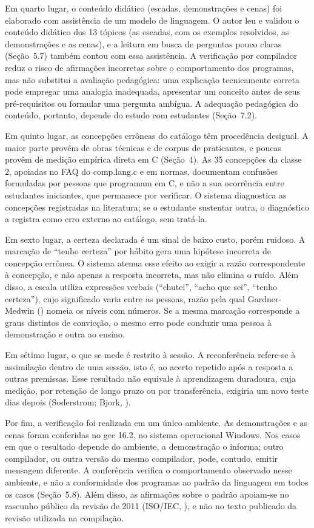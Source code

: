 Em quarto lugar, o conteúdo didático (escadas, demonstrações e cenas) foi elaborado com assistência de um modelo de linguagem. O autor leu e validou o conteúdo didático dos 13 tópicos (as escadas, com os exemplos resolvidos, as demonstrações e as cenas), e a leitura em busca de perguntas pouco claras (Seção~5.7) também contou com essa assistência. A verificação por compilador reduz o risco de afirmações incorretas sobre o comportamento dos programas, mas não substitui a avaliação pedagógica: uma explicação tecnicamente correta pode empregar uma analogia inadequada, apresentar um conceito antes de seus pré-requisitos ou formular uma pergunta ambígua. A adequação pedagógica do conteúdo, portanto, depende do estudo com estudantes (Seção~7.2).

Em quinto lugar, as concepções errôneas do catálogo têm procedência desigual. A maior parte provém de obras técnicas e de corpus de praticantes, e poucas provêm de medição empírica direta em C (Seção~4). As 35 concepções da classe 2, apoiadas no FAQ do comp.lang.c e em normas, documentam confusões formuladas por pessoas que programam em C, e não a sua ocorrência entre estudantes iniciantes, que permanece por verificar. O sistema diagnostica as concepções registradas na literatura; se o estudante sustentar outra, o diagnóstico a registra como erro externo ao catálogo, sem tratá-la.

Em sexto lugar, a certeza declarada é um sinal de baixo custo, porém ruidoso. A marcação de ``tenho certeza'' por hábito gera uma hipótese incorreta de concepção errônea. O sistema atenua esse efeito ao exigir a razão correspondente à concepção, e não apenas a resposta incorreta, mas não elimina o ruído. Além disso, a escala utiliza expressões verbais (``chutei'', ``acho que sei'', ``tenho certeza''), cujo significado varia entre as pessoas, razão pela qual Gardner-Medwin (\citeyear{gardnermedwin2006}) nomeia os níveis com números. Se a mesma marcação corresponde a graus distintos de convicção, o mesmo erro pode conduzir uma pessoa à demonstração e outra ao ensino.

Em sétimo lugar, o que se mede é restrito à sessão. A reconferência refere-se à assimilação dentro de uma sessão, isto é, ao acerto repetido após a resposta a outras premissas. Esse resultado não equivale à aprendizagem duradoura, cuja medição, por retenção de longo prazo ou por transferência, exigiria um novo teste dias depois (Soderstrom; Bjork, \citeyear{soderstrom2015}).

Por fim, a verificação foi realizada em um único ambiente. As demonstrações e as cenas foram conferidas no gcc 16.2, no sistema operacional Windows. Nos casos em que o resultado depende do ambiente, a demonstração o informa; outro compilador, ou outra versão do mesmo compilador, pode, contudo, emitir mensagem diferente. A conferência verifica o comportamento observado nesse ambiente, e não a conformidade dos programas ao padrão da linguagem em todos os casos (Seção~5.8). Além disso, as afirmações sobre o padrão apoiam-se no rascunho público da revisão de 2011 (ISO/IEC, \citeyear{isoiec2011}), e não no texto publicado da revisão utilizada na compilação.

